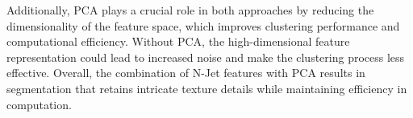 \documentclass[12pt]{article}
\begin{document}
Additionally, PCA plays a crucial role in both approaches by reducing the dimensionality of the feature space, which improves clustering performance and computational efficiency. Without PCA, the high-dimensional feature representation could lead to increased noise and make the clustering process less effective. Overall, the combination of N-Jet features with PCA results in segmentation that retains intricate texture details while maintaining efficiency in computation.
\end{document}
